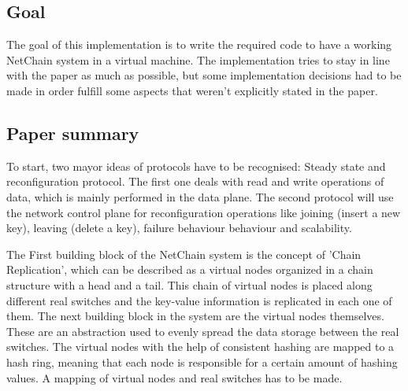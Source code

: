 \documentclass[11pt,oneside,a4paper]{article}
\begin{document}
\subsection{Goal}
The goal of this implementation is to write the required code to have a working NetChain system in a virtual machine. The implementation tries to stay in line with the paper as much as possible, but some implementation decisions had to be made in order fulfill some aspects that weren't explicitly stated in the paper. 

\subsection{Paper summary}

To start, two  mayor ideas of protocols have to be recognised: Steady state and reconfiguration protocol. The first one deals with read and write operations of data, which is mainly performed in the data plane. The second protocol will use the network control plane for reconfiguration operations like joining (insert a new key), leaving (delete a key), failure behaviour behaviour and scalability. 

The First building block of the NetChain system is the concept of 'Chain Replication', which can be described as a virtual nodes organized in a chain structure with a head and a tail. This chain of virtual nodes is placed along different real switches and the key-value information is replicated in each one of them. The next building block in the system are the virtual nodes themselves. These are an abstraction used to evenly spread the data storage between the real switches. The virtual nodes with the help of consistent hashing are mapped to a hash ring, meaning that each node is responsible for a certain amount of hashing values. A mapping of virtual nodes and real switches has to be made.
\end{document}
